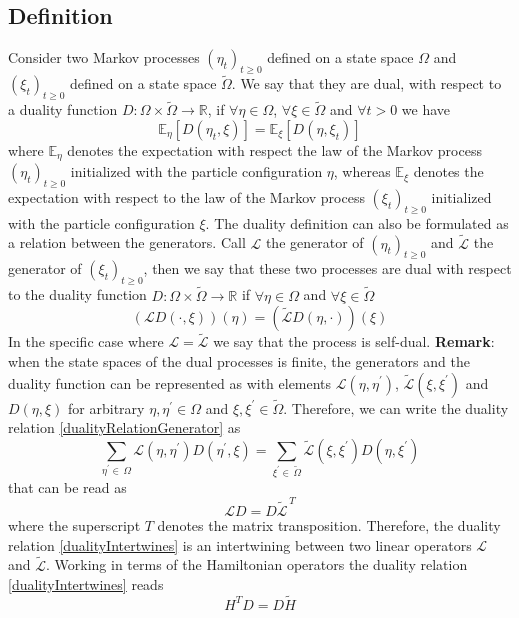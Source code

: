\documentclass[10pt]{article}
\numberwithin{equation}{section}
\numberwithin{equation}{subsection}
\begin{document}
\subsection{Definition}
Consider two Markov processes $(\eta_{t})_{t\geq 0}$ defined on a state space $\Omega$ and $(\xi_{t})_{t\geq 0}$ defined on a state space $\widetilde{\Omega}$. We say that they are dual, with respect to a duality function $D:\Omega\times \widetilde{\Omega}\to \mathbb{R}$, if $\forall \eta\in\Omega$, $\forall \xi\in\widetilde{\Omega}$ and $\forall t> 0$ we have 
\begin{equation}
    \mathbb{E}_{\eta}\left[D(\eta_{t},\xi)\right]=\mathbb{E}_{\xi}\left[D(\eta,\xi_{t})\right]
\end{equation}
where $\mathbb{E}_{\eta}$ denotes the expectation with respect the law of the Markov process $(\eta_{t})_{t\geq 0}$ initialized with the particle configuration $\eta$, whereas $\mathbb{E}_{\xi}$ denotes the expectation with respect to the law of the Markov process $(\xi_{t})_{t\geq 0}$ initialized with the particle configuration $\xi$.
The duality definition can also be formulated as a relation between the generators. Call $\mathcal{L}$ the generator of $(\eta_{t})_{t\geq0}$ and $\widetilde{\mathcal{L}}$ the generator of $(\xi_{t})_{t\geq 0}$, then we say that these two processes are dual with respect to the duality function $D:\Omega\times \widetilde{\Omega}\to \mathbb{R}$ if $\forall \eta\in\Omega$ and $\forall \xi\in\widetilde{\Omega}$
\begin{equation}\label{dualityRelationGenerator}
    \left(\mathcal{L}D(\cdot,\xi)\right)(\eta)=\left(\widetilde{\mathcal{L}}D(\eta,\cdot)\right)(\xi)
\end{equation}
In the specific case where $\mathcal{L}=\widetilde{\mathcal{L}}$ we say that the process is self-dual.
\newline
\newline
\textbf{Remark}:
when the state spaces of the dual processes is finite, the generators and the duality function can be represented as with elements $\mathcal{L}(\eta,\eta^{'})$, $\widetilde{\mathcal{L}}(\xi,\xi^{'})$ and $D(\eta,\xi)$ for arbitrary $\eta,\eta^{'}\in\Omega$ and $\xi,\xi^{'}\in \widetilde{\Omega}$. Therefore, we can write the duality relation \eqref{dualityRelationGenerator} as 
\begin{equation}
    \sum_{\eta^{'}\in\,\Omega}\mathcal{L}(\eta,\eta^{'})D(\eta^{'},\xi)=\sum_{\xi^{'}\in\, \widetilde{\Omega}}\widetilde{\mathcal{L}}(\xi,\xi^{'})D(\eta,\xi^{'})
\end{equation}
that can be read as
\begin{equation}\label{dualityIntertwines}
    \mathcal{L}D=D\widetilde{\mathcal{L}}^{\,T}
\end{equation}
where the superscript $T$ denotes the matrix transposition. Therefore, the duality relation \eqref{dualityIntertwines} is an intertwining between two linear operators $\mathcal{L}$ and $\widetilde{\mathcal{L}}$. Working in terms of the Hamiltonian operators the duality relation \eqref{dualityIntertwines} reads 
\begin{equation}\label{DualityRelation}
    H^{T}D=D\widetilde{H}
\end{equation}
\end{document}
